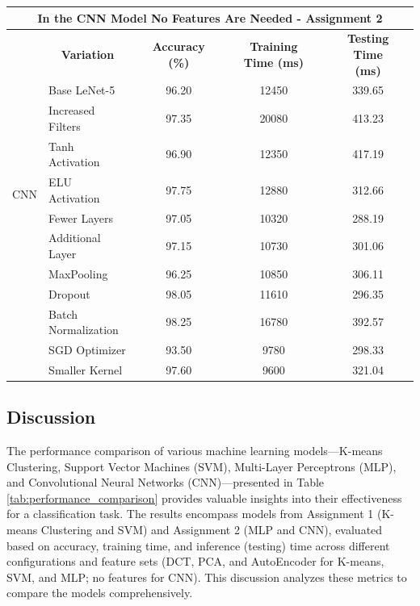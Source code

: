\documentclass[a4paper,12pt]{article}
\begin{document}
\begin{table}[H]
{\begin{tabular}{l|l|l|ccc|ccc|ccc}
        \midrule
        \multicolumn{12}{c}{In the CNN Model No Features Are Needed - Assignment 2} \\
        \midrule
        \multirow{11}{*}{CNN} & \multicolumn{2}{c|}{\textbf{Variation}} & & \textbf{Accuracy (\%)} & &  &\textbf{Training Time (ms)} & & &\textbf{Testing Time (ms)} \\
        \cmidrule(lr){2-12}
        & \multicolumn{2}{l|}{Base LeNet-5}  & & 96.20 & & &12450 & & & 339.65 \\
        & \multicolumn{2}{l|}{Increased Filters} & & 97.35 & & & 20080 & & & 413.23 \\
        & \multicolumn{2}{l|}{Tanh Activation} & & 96.90 & & & 12350 & & & 417.19 \\
        & \multicolumn{2}{l|}{ELU Activation} & & 97.75 & & & 12880 & & & 312.66  \\
        & \multicolumn{2}{l|}{Fewer Layers} & & 97.05 & & & 10320 & & & 288.19 \\
        & \multicolumn{2}{l|}{Additional Layer} & & 97.15 & & & 10730 & & & 301.06 \\
        & \multicolumn{2}{l|}{MaxPooling} & & 96.25 & & & 10850 & & & 306.11 \\
        & \multicolumn{2}{l|}{Dropout} & & 98.05 & & & 11610 & & & 296.35  \\
        & \multicolumn{2}{l|}{Batch Normalization} & & 98.25 & & & 16780 & & & 392.57 \\
        & \multicolumn{2}{l|}{SGD Optimizer} & & 93.50 & & & 9780 & & & 298.33  \\
        & \multicolumn{2}{l|}{Smaller Kernel} & & 97.60 & & & 9600 & & & 321.04 \\
        \bottomrule
    \end{tabular}
    }
\end{table}
\subsection{Discussion}

The performance comparison of various machine learning models—K-means Clustering, Support Vector Machines (SVM), Multi-Layer Perceptrons (MLP), and Convolutional Neural Networks (CNN)—presented in Table \ref{tab:performance_comparison} provides valuable insights into their effectiveness for a classification task. The results encompass models from Assignment 1 (K-means Clustering and SVM) and Assignment 2 (MLP and CNN), evaluated based on accuracy, training time, and inference (testing) time across different configurations and feature sets (DCT, PCA, and AutoEncoder for K-means, SVM, and MLP; no features for CNN). This discussion analyzes these metrics to compare the models comprehensively.
\end{document}
